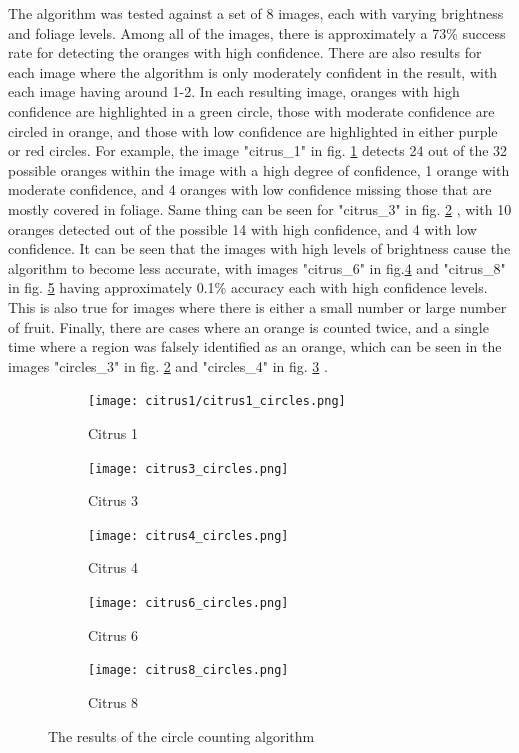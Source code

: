 \documentclass[conference]{IEEEtran}
\begin{document}
The algorithm was tested against a set of 8 images, each with varying brightness and foliage levels. Among all of the images, there is approximately a 73\% success rate for detecting the oranges with high confidence. There are also results for each image where the algorithm is only moderately confident in the result, with each image having around 1-2. In each resulting image, oranges with high confidence are highlighted in a green circle, those with moderate confidence are circled in orange, and those with low confidence are highlighted in either purple or red circles. For example, the image "citrus\_1" in fig. \ref{fig:citrus_results_1} detects 24 out of the 32 possible oranges within the image with a high degree of confidence, 1 orange with moderate confidence, and 4 oranges with low confidence missing those that are mostly covered in foliage. Same thing can be seen for "citrus\_3" in fig. \ref{fig:citrus_results_3} , with 10 oranges detected out of the possible 14 with high confidence, and 4 with low confidence. It can be seen that the images with high levels of brightness cause the algorithm to become less accurate, with images "citrus\_6"  in fig.\ref{fig:citrus_results_6} and "citrus\_8" in fig. \ref{fig:citrus_results_8}  having approximately 0.1\% accuracy each with high confidence levels. This is also true for images where there is either a small number or large number of fruit. Finally, there are cases where an orange is counted twice, and a single time where a region was falsely identified as an orange, which can be seen in the images "circles\_3" in fig. \ref{fig:citrus_results_3} and "circles\_4" in fig. \ref{fig:citrus_results_4} .

\begin{figure}[H]
  \begin{subfigure}{.3\linewidth}
   \texttt{[image: citrus1/citrus1\_circles.png]}\hfill
   \caption{Citrus 1} \label{fig:citrus_results_1}
  \end{subfigure}
   \begin{subfigure}{.3\linewidth}
   \texttt{[image: citrus3\_circles.png]}\hfill
   \caption{Citrus 3}  \label{fig:citrus_results_3}
  \end{subfigure}
   \begin{subfigure}{.3\linewidth}
   \texttt{[image: citrus4\_circles.png]}
   \caption{Citrus 4}  \label{fig:citrus_results_4}
  \end{subfigure}\par\medskip
  
    \begin{subfigure}{.3\linewidth}
   \texttt{[image: citrus6\_circles.png]}\hfill
   \caption{Citrus 6}  \label{fig:citrus_results_6}
  \end{subfigure}
   \begin{subfigure}{.3\linewidth}
   \texttt{[image: citrus8\_circles.png]}
   \caption{Citrus 8}  \label{fig:citrus_results_8}
  \end{subfigure}
  \caption{The results of the circle counting algorithm} \label{fig:citrus_results}
\end{figure}
\end{document}
